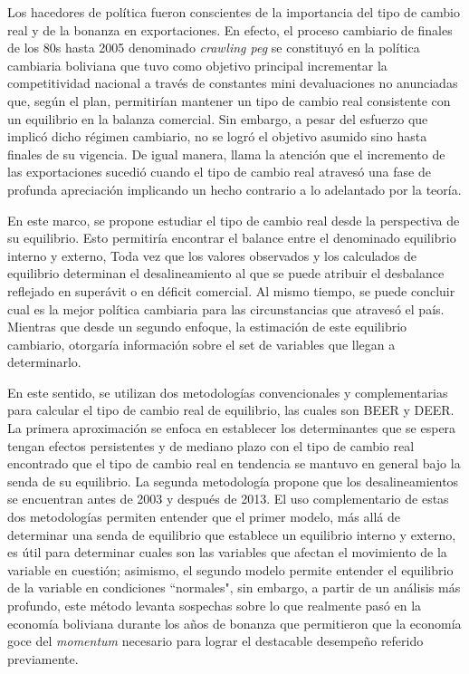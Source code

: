 \documentclass[12pt,letterpaper]{article}
\begin{document}
Los hacedores de política fueron conscientes de la importancia del tipo de cambio real y de la bonanza en exportaciones. En efecto, el proceso cambiario de finales de los 80s hasta 2005 denominado \emph{crawling peg} se constituyó en la política cambiaria boliviana que tuvo como objetivo principal incrementar la competitividad nacional a través de constantes mini devaluaciones no anunciadas que, según el plan, permitirían mantener un tipo de cambio real consistente con un equilibrio en la balanza comercial. Sin embargo, a pesar del esfuerzo que implicó dicho régimen cambiario, no se logró el objetivo asumido sino hasta finales de su vigencia. De igual manera, llama la atención que el incremento de las exportaciones sucedió cuando el tipo de cambio real atravesó una fase de profunda apreciación implicando un hecho contrario a lo adelantado por la teoría.

En este marco, se propone estudiar el tipo de cambio real desde la perspectiva de su equilibrio. Esto permitiría encontrar el balance entre el denominado equilibrio interno y externo, Toda vez que los valores observados y los calculados de equilibrio determinan el desalineamiento al que se puede atribuir el desbalance reflejado en superávit o en déficit comercial. Al mismo tiempo, se puede concluir cual es la mejor política cambiaria para las circunstancias que atravesó el país. Mientras que desde un segundo enfoque, la estimación de este equilibrio cambiario, otorgaría información sobre el set de variables que llegan a determinarlo. 

En este sentido, se utilizan dos metodologías convencionales y complementarias para calcular el tipo de cambio real de equilibrio, las cuales son BEER y DEER. La primera aproximación se enfoca en establecer los determinantes que se espera tengan efectos persistentes y de mediano plazo con el tipo de cambio real encontrado que el tipo de cambio real en tendencia se mantuvo en general bajo la senda de su equilibrio. La segunda metodología propone que los desalineamientos se encuentran antes de 2003 y después de 2013. El uso complementario de estas dos metodologías permiten entender que el primer modelo, más allá de determinar una senda de equilibrio que establece un equilibrio interno y externo, es útil para determinar cuales son las variables que afectan el movimiento de la variable en cuestión; asimismo, el segundo modelo permite entender el equilibrio de la variable en condiciones ``normales", sin embargo, a partir de un análisis más profundo, este método levanta sospechas sobre lo que realmente pasó en la economía boliviana durante los años de bonanza que permitieron que la economía goce del \emph{momentum} necesario para lograr el destacable desempeño referido previamente.
\end{document}
